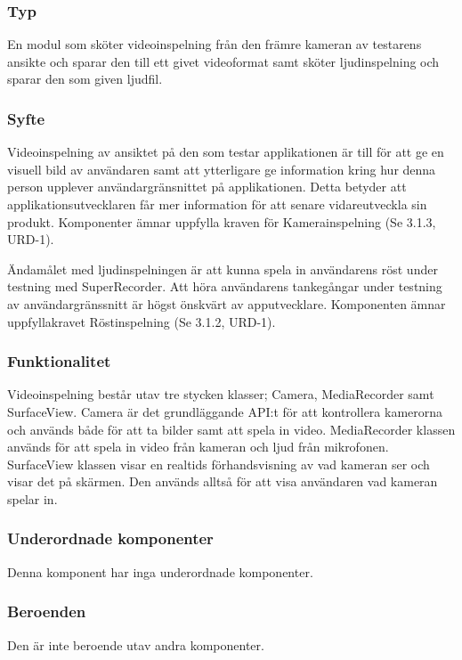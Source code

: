 \subsubsection{Typ}
En modul som sköter videoinspelning från den främre kameran av testarens ansikte och sparar den till ett givet videoformat samt sköter ljudinspelning och sparar den som given ljudfil.

\subsubsection{Syfte}
Videoinspelning av ansiktet på den som testar applikationen är till för att ge en visuell bild av användaren samt att ytterligare ge information kring hur denna person upplever användargränsnittet på applikationen. Detta betyder att applikationsutvecklaren får mer information för att senare vidareutveckla sin produkt. Komponenter ämnar uppfylla kraven för Kamerainspelning (Se 3.1.3, URD-1).

Ändamålet med ljudinspelningen är att kunna spela in användarens röst under testning med SuperRecorder. Att höra användarens tankegångar under testning av användargränssnitt är högst önskvärt av apputvecklare. Komponenten ämnar uppfyllakravet Röstinspelning (Se 3.1.2, URD-1).

\subsubsection{Funktionalitet}
Videoinspelning består utav tre stycken klasser; Camera, MediaRecorder samt SurfaceView. Camera är det grundläggande API:t för att kontrollera kamerorna och används både för att ta bilder samt att spela in video. MediaRecorder klassen används för att spela in video från kameran och ljud från mikrofonen. SurfaceView klassen visar en realtids förhandsvisning av vad kameran ser och visar det på skärmen. Den används alltså för att visa användaren vad kameran spelar in.

\subsubsection{Underordnade komponenter}
Denna komponent har inga underordnade komponenter.

\subsubsection{Beroenden}
Den är inte beroende utav andra komponenter.

